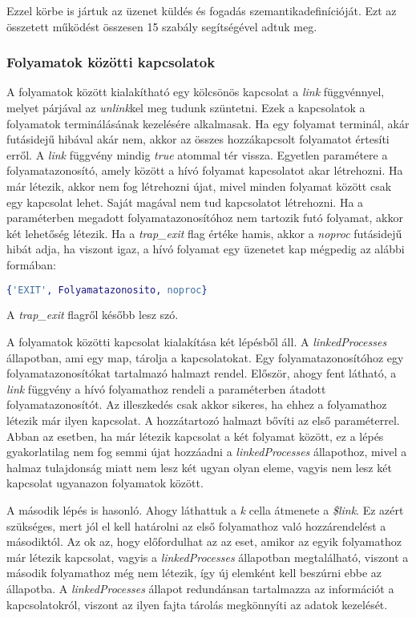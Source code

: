 Ezzel körbe is jártuk az üzenet küldés és fogadás szemantikadefinícióját. Ezt az összetett működést összesen 15 szabály segítségével adtuk meg.

\subsubsection{Folyamatok közötti kapcsolatok}

A folyamatok között kialakítható egy kölcsönös kapcsolat a \textit{link} függvénnyel, melyet párjával az \textit{unlink}kel meg tudunk szüntetni. Ezek a kapcsolatok a folyamatok terminálásának kezelésére alkalmasak. Ha egy folyamat terminál, akár futásidejű hibával akár nem, akkor az összes hozzákapcsolt folyamatot értesíti erről. A \textit{link} függvény mindig \textit{true} atommal tér vissza. Egyetlen paramétere a folyamatazonosító, amely között a hívó folyamat kapcsolatot akar létrehozni. Ha már létezik, akkor nem fog létrehozni újat, mivel minden folyamat között csak egy kapcsolat lehet. Saját magával nem tud kapcsolatot létrehozni. Ha a paraméterben megadott folyamatazonosítóhoz nem tartozik futó folyamat, akkor két lehetőség létezik. Ha a \textit{trap\_exit} flag értéke hamis, akkor a \textit{noproc} futásidejű hibát adja, ha viszont igaz, a hívó folyamat egy üzenetet kap mégpedig az alábbi formában:

\begin{lstlisting}[language=Erlang]
{'EXIT', Folyamatazonosito, noproc}
\end{lstlisting}

A \textit{trap\_exit} flagről később lesz szó.



A folyamatok közötti kapcsolat kialakítása két lépésből áll. A \textit{linkedProcesses} állapotban, ami egy map, tárolja a kapcsolatokat. Egy folyamatazonosítóhoz egy folyamatazonosítókat tartalmazó halmazt rendel. Először, ahogy fent látható, a \textit{link} függvény a hívó folyamathoz rendeli a paraméterben átadott folyamatazonosítót. Az illeszkedés csak akkor sikeres, ha ehhez a folyamathoz létezik már ilyen kapcsolat. A hozzátartozó halmazt bővíti az első paraméterrel. Abban az esetben, ha már létezik kapcsolat a két folyamat között, ez a lépés gyakorlatilag nem fog semmi újat hozzáadni a \textit{linkedProcesses} állapothoz, mivel a halmaz tulajdonság miatt nem lesz két ugyan olyan eleme, vagyis nem lesz két kapcsolat ugyanazon folyamatok között.

A második lépés is hasonló. Ahogy láthattuk a \textit{k} cella átmenete a \textit{\$link}. Ez azért szükséges, mert jól el kell határolni az első folyamathoz való hozzárendelést a másodiktól. Az ok az, hogy előfordulhat az az eset, amikor az egyik folyamathoz már létezik kapcsolat, vagyis a \textit{linkedProcesses} állapotban megtalálható, viszont a második folyamathoz még nem létezik, így új elemként kell beszúrni ebbe az állapotba. A \textit{linkedProcesses} állapot redundánsan tartalmazza az információt a kapcsolatokról, viszont az ilyen fajta tárolás megkönnyíti az adatok kezelését.

